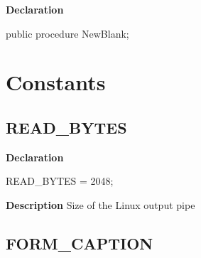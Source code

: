 \documentclass{report}
\newif\ifpdf
\begin{document}
\label{editor.TFrmEditor-NewBlank}
\begin{list}{}{
\setlength{\itemindent}{0cm}
\setlength{\listparindent}{0cm}
\setlength{\leftmargin}{\evensidemargin}
\addtolength{\leftmargin}{\tmplength}
\settowidth{\labelsep}{X}
\addtolength{\leftmargin}{\labelsep}
\setlength{\labelwidth}{\tmplength}
}
\item[\textbf{Declaration}\hfill]
\ifpdf
\begin{flushleft}
\fi
\begin{ttfamily}
public procedure NewBlank;\end{ttfamily}

\ifpdf
\end{flushleft}
\fi

\end{list}
\section{Constants}
\ifpdf
\subsection*{\large{\textbf{READ{\_}BYTES}}\normalsize\hspace{1ex}\hrulefill}
\else
\subsection*{READ{\_}BYTES}
\fi
\label{editor-READ_BYTES}
\begin{list}{}{
\setlength{\itemindent}{0cm}
\setlength{\listparindent}{0cm}
\setlength{\leftmargin}{\evensidemargin}
\addtolength{\leftmargin}{\tmplength}
\settowidth{\labelsep}{X}
\addtolength{\leftmargin}{\labelsep}
\setlength{\labelwidth}{\tmplength}
}
\item[\textbf{Declaration}\hfill]
\ifpdf
\begin{flushleft}
\fi
\begin{ttfamily}
READ{\_}BYTES = 2048;\end{ttfamily}

\ifpdf
\end{flushleft}
\fi

\par
\item[\textbf{Description}]
Size of the Linux output pipe

\end{list}
\ifpdf
\subsection*{\large{\textbf{FORM{\_}CAPTION}}\normalsize\hspace{1ex}\hrulefill}
\else
\end{document}
